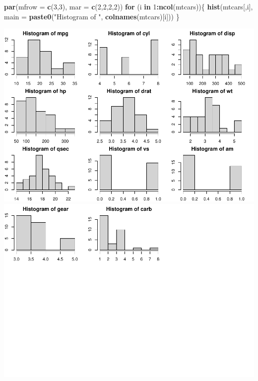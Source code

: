 \documentclass[
]{book}
\newenvironment{Shaded}{\begin{snugshade}}{\end{snugshade}}
\newcommand{\AttributeTok}[1]{\textcolor[rgb]{0.13,0.29,0.53}{#1}}
\newcommand{\ControlFlowTok}[1]{\textcolor[rgb]{0.13,0.29,0.53}{\textbf{#1}}}
\newcommand{\DecValTok}[1]{\textcolor[rgb]{0.00,0.00,0.81}{#1}}
\newcommand{\FunctionTok}[1]{\textcolor[rgb]{0.13,0.29,0.53}{\textbf{#1}}}
\newcommand{\NormalTok}[1]{#1}
\newcommand{\SpecialCharTok}[1]{\textcolor[rgb]{0.81,0.36,0.00}{\textbf{#1}}}
\newcommand{\StringTok}[1]{\textcolor[rgb]{0.31,0.60,0.02}{#1}}
\begin{document}
\begin{Shaded}
\begin{Highlighting}[]
\FunctionTok{par}\NormalTok{(}\AttributeTok{mfrow =} \FunctionTok{c}\NormalTok{(}\DecValTok{3}\NormalTok{,}\DecValTok{3}\NormalTok{), }\AttributeTok{mar =} \FunctionTok{c}\NormalTok{(}\DecValTok{2}\NormalTok{,}\DecValTok{2}\NormalTok{,}\DecValTok{2}\NormalTok{,}\DecValTok{2}\NormalTok{))}
\ControlFlowTok{for}\NormalTok{ (i }\ControlFlowTok{in} \DecValTok{1}\SpecialCharTok{:}\FunctionTok{ncol}\NormalTok{(mtcars))\{}
  \FunctionTok{hist}\NormalTok{(mtcars[,i], }\AttributeTok{main =} \FunctionTok{paste0}\NormalTok{(}\StringTok{"Histogram of "}\NormalTok{, }\FunctionTok{colnames}\NormalTok{(mtcars)[i]))}
\NormalTok{\}}
\end{Highlighting}
\end{Shaded}

\includegraphics{bookdown-demo_files/figure-latex/unnamed-chunk-4-1.pdf} \includegraphics{bookdown-demo_files/figure-latex/unnamed-chunk-4-2.pdf}
\end{document}
